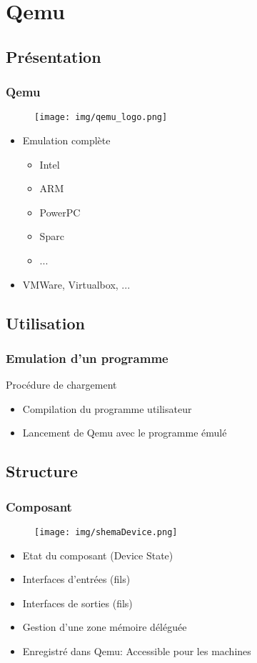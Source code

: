 \documentclass{beamer}
\begin{document}
	
	
	\section{Qemu}
		\subsection{Présentation}
			\begin{frame}
				\frametitle{Qemu}
				\begin{figure}
						\texttt{[image: img/qemu\_logo.png]}
					\end{figure}
				\begin{itemize}
					\item Emulation complète
						\begin{itemize}
							\item Intel
							\item ARM
							\item PowerPC
							\item Sparc
							\item ...
						\end{itemize}
					\item VMWare, Virtualbox, ...
				\end{itemize}
			\end{frame}
			
			
		\subsection{Utilisation}
			\begin{frame}
				\frametitle{Emulation d'un programme}
				\begin{block}{ Procédure de chargement }
					\begin{itemize}
						\item Compilation du programme utilisateur
						\item Lancement de Qemu avec le programme émulé
					\end{itemize}
				\end{block}
			\end{frame}
			
			
		\subsection{Structure}
			\begin{frame}
				\frametitle{Composant}
				\begin{figure}
					\texttt{[image: img/shemaDevice.png]}
				\end{figure}
				\begin{itemize}
					\item Etat du composant (Device State)
					\item Interfaces d'entrées (fils)
					\item Interfaces de sorties (fils)
					\item Gestion d'une zone mémoire déléguée
					\item Enregistré dans Qemu: Accessible pour les machines
				\end{itemize}
			\end{frame}
			
\end{document}
